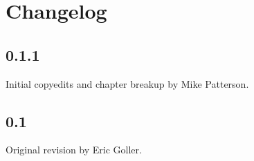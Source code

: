 \section{Changelog}

\subsection{0.1.1}
Initial copyedits and chapter breakup by Mike Patterson.

\subsection{0.1}
Original revision by Eric Goller.
